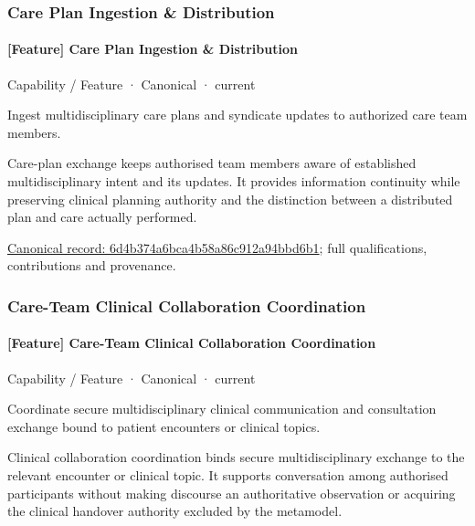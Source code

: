 \subsubsection{Care Plan Ingestion \& Distribution}

\paragraph{[Feature] Care Plan Ingestion \& Distribution}

\label{element:6d4b374a6bca4b58a86c912a94bbd6b1}
{\small Capability / Feature · Canonical · current}\par

Ingest multidisciplinary care plans and syndicate updates to authorized care team members.



Care-plan exchange keeps authorised team members aware of established multidisciplinary intent and its updates. It provides information continuity while preserving clinical planning authority and the distinction between a distributed plan and care actually performed.


{\footnotesize \href{../../../../continuum/strategy/capability/feature/6d4b374a6bca4b58a86c912a94bbd6b1.md}{Canonical record: 6d4b374a6bca4b58a86c912a94bbd6b1}; full qualifications, contributions and provenance.}\par
\subsubsection{Care-Team Clinical Collaboration Coordination}

\paragraph{[Feature] Care-Team Clinical Collaboration Coordination}

\label{element:b0860d6b68f34b8cb2f93b25cdf2aa97}
{\small Capability / Feature · Canonical · current}\par

Coordinate secure multidisciplinary clinical communication and consultation exchange bound to patient encounters or clinical topics.



Clinical collaboration coordination binds secure multidisciplinary exchange to the relevant encounter or clinical topic. It supports conversation among authorised participants without making discourse an authoritative observation or acquiring the clinical handover authority excluded by the metamodel.


